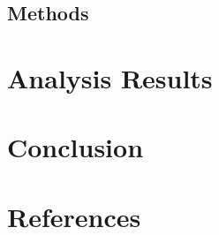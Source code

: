\documentclass[
  man,
  floatsintext,
  longtable,
  nolmodern,
  notxfonts,
  notimes,
  colorlinks=true,linkcolor=blue,citecolor=blue,urlcolor=blue]{apa7}
\begin{document}
\subsection{Methods}\label{methods}

\section{Analysis Results}\label{analysis-results}

\section{Conclusion}\label{conclusion}

\clearpage

\section{References}\label{references}
\end{document}
